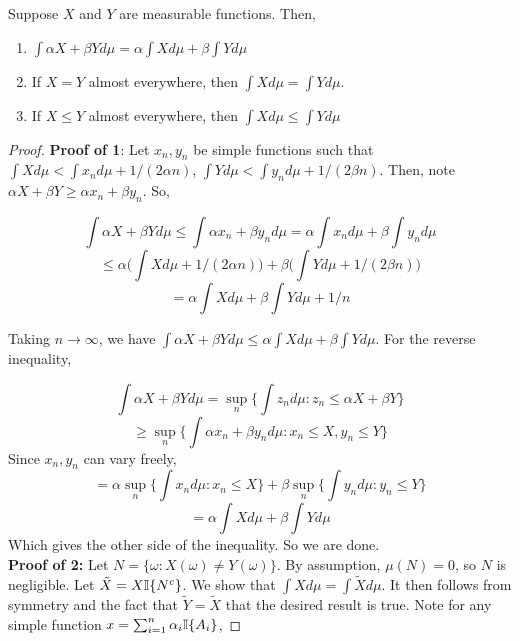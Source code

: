     \begin{theorem}\label{thm:integral_properties}
        Suppose $X$ and $Y$ are measurable functions. Then, 
        \begin{enumerate}
            \item $\int \alpha X + \beta Y d\mu = \alpha \int X d\mu + \beta \int Y d\mu$
            \item If $X = Y$ almost everywhere, then $\int X d\mu = \int Y d\mu$.
            \item If $X \leq Y$ almost everywhere, then $\int X d\mu \leq \int Y d\mu$
        \end{enumerate}
    \end{theorem}
        \begin{proof}
            \textbf{Proof of 1}:  Let $x_n, y_n$ be simple functions 
            such that $\int X d\mu < \int x_n d\mu + 1/(2\alpha n)$, $\int Yd\mu < \int y_n d\mu + 1/(2\beta n)$. 
            Then, note $\alpha X + \beta Y \geq \alpha x_n + \beta y_n$. So, 

            \[ \int \alpha X + \beta Y d\mu \leq \int \alpha x_n + \beta y_nd\mu = \alpha \int x_n d\mu + \beta \int y_n d\mu \]
            \[ \leq \alpha \bigg(\int Xd\mu + 1/(2\alpha n)\bigg) +  \beta \bigg(\int Y d\mu + 1/(2\beta n)\bigg)  \]
            \[ = \alpha \int Xd\mu + \beta \int Y d\mu + 1/n \]

            Taking $n \to \infty$, we have $\int \alpha X + \beta Y d\mu \leq\alpha \int Xd\mu + \beta \int Y d\mu$. For 
            the reverse inequality, 

            \[  \int \alpha X + \beta Y d\mu = \sup_n \bigg\{ \int z_n d\mu : z_n \leq \alpha X + \beta Y \bigg\} \]
            \[ \geq \sup_n \bigg\{ \int \alpha x_n + \beta y_n d\mu : x_n \leq X, y_n \leq Y \bigg\}\]
            Since $x_n, y_n$ can vary freely,
            \[ =  \alpha \sup_n \bigg\{ \int x_n  d\mu : x_n \leq X \bigg\} + \beta \sup_n \bigg\{ \int  y_n  d\mu : y_n \leq Y \bigg\}  \]
            \[ = \alpha \int X d\mu + \beta \int Y d\mu \]
            Which gives the other side of the inequality. So we are done.\\

            \textbf{Proof of 2:} Let $N = \{\omega : X(\omega) \neq Y(\omega)\}$. By assumption, 
            $\mu(N) = 0$, so $N$ is negligible. Let $\tilde{X} = X\mathbb I\{N^c\}$. We show that 
            $\int X d\mu = \int \tilde{X} d\mu$. It then follows from symmetry and the fact that 
            $\tilde{Y} = \tilde{X}$ that the desired result is true. Note for any simple function $x = \sum_{i=1}^n \alpha_i \mathbb I\{A_i\}$, 


\end{proof}
